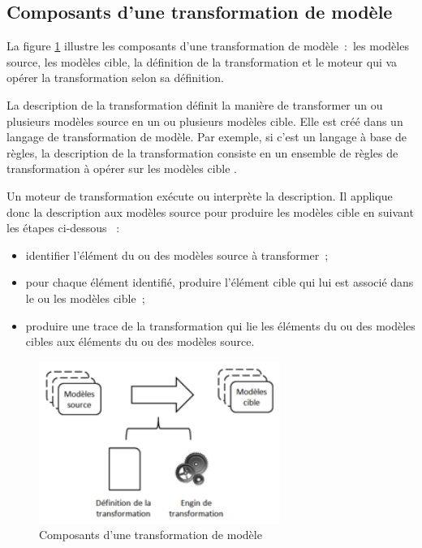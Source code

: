 \subsection{Composants d'une transformation de modèle} 
La figure \ref{fig:composantTransfo} illustre les composants d'une 
transformation de modèle~:~les modèles source, les modèles cible, la définition 
de la transformation et le moteur qui va opérer la transformation selon sa 
définition. 

La description de la transformation définit la manière de transformer un ou plusieurs modèles source en un ou plusieurs modèles cible. Elle est créé dans 
un langage de transformation de modèle. Par exemple, si c'est un langage à base 
de règles, la description de la transformation consiste en un ensemble de règles 
de transformation à opérer sur les modèles cible \cite{kleppe2003mda}. 

Un moteur de transformation exécute ou interprète la description. Il applique 
donc la description aux modèles source pour produire les modèles cible en 
suivant les étapes ci-dessous \cite{tratt2005model}~:

\begin{itemize}
\item identifier l'élément du ou des modèles source à transformer~;
\item pour chaque élément identifié, produire l'élément cible qui lui est 
associé dans le ou les modèles cible~;
\item produire une trace de la transformation qui lie les éléments du ou des 
modèles cibles aux éléments du ou des modèles source.
\end{itemize}

\begin{figure}[!htbp]
 \begin{center}
   \includegraphics[width=0.7\textwidth]{figures/images/Chapitre1/composanttransfo.png}
 \end{center}
 \caption{Composants d'une transformation de modèle}
 \label{fig:composantTransfo}
\end{figure}

